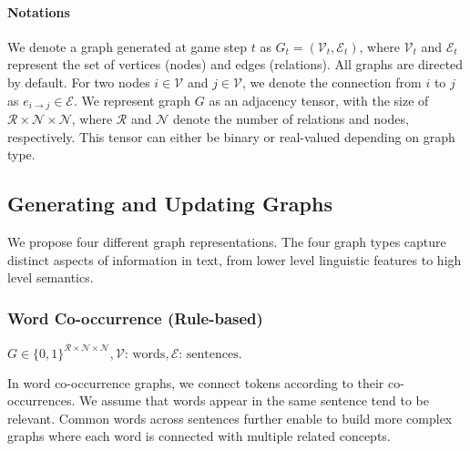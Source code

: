 \documentclass[11pt]{article}
\begin{document}
\paragraph{Notations}

We denote a graph generated at game step $t$ as $G_t=(\mathcal{V}_t, \mathcal{E}_t)$, where $\mathcal{V}_t$ and $\mathcal{E}_t$ represent the set of vertices (nodes) and edges (relations).
All graphs are directed by default. 
For two nodes $i \in \mathcal{V}$ and $j \in \mathcal{V}$, we denote the connection from $i$ to $j$ as $e_{i \rightarrow j} \in \mathcal{E}$.
We represent graph $G$ as an adjacency tensor, with the size of ${\mathcal{R} \times \mathcal{N} \times \mathcal{N}}$, where $\mathcal{R}$ and $\mathcal{N}$ denote the number of relations and nodes, respectively.
This tensor can either be binary or real-valued depending on graph type.

\subsection{Generating and Updating Graphs}
\label{subsection:graph_updater}

We propose four different graph representations.
The four graph types capture distinct aspects of information in text, from lower level linguistic features to high level semantics.


\subsubsection{Word Co-occurrence \textbf{\small{(Rule-based)}}}
\label{subsection:cooccur}
\begin{center} 
    \textcolor{blue1}{\textbf{\small{$G \in \{0, 1\}^{\mathcal{R} \times \mathcal{N} \times \mathcal{N}}, \mathcal{V}\text{: words}, \mathcal{E}\text{: sentences.}$}}}    
\end{center}

In word co-occurrence graphs, we connect tokens according to their co-occurrences. 
We assume that words appear in the same sentence tend to be relevant.
Common words across sentences further enable to build more complex graphs where each word is connected with multiple related concepts.
\end{document}

